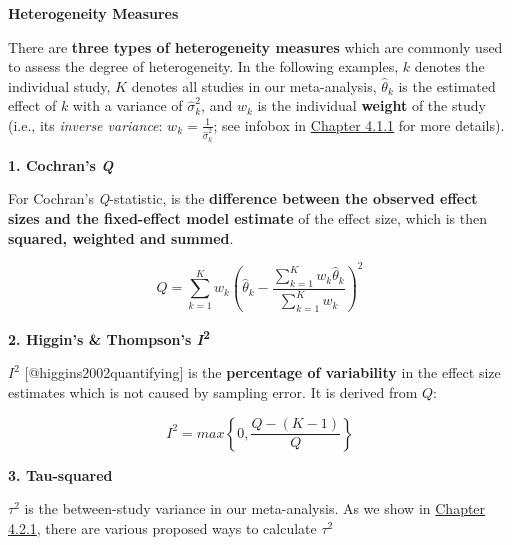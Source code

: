 \documentclass[]{book}
\theoremstyle{definition}
\theoremstyle{definition}
\theoremstyle{definition}
\theoremstyle{remark}
\begin{document}
\begin{rmdinfo}
\textbf{Heterogeneity Measures}

There are \textbf{three types of heterogeneity measures} which are
commonly used to assess the degree of heterogeneity. In the following
examples, \(k\) denotes the individual study, \(K\) denotes all studies
in our meta-analysis, \(\hat \theta_k\) is the estimated effect of \(k\)
with a variance of \(\hat \sigma^{2}_k\), and \(w_k\) is the individual
\textbf{weight} of the study (i.e., its \emph{inverse variance}:
\(w_k = \frac{1}{\hat \sigma^{2}_k}\); see infobox in
\protect\hyperlink{fixed}{Chapter 4.1.1} for more details).

\textbf{1. Cochran's \emph{Q} }

For Cochran's \emph{Q}-statistic, is the \textbf{difference between the
observed effect sizes and the fixed-effect model estimate} of the effect
size, which is then \textbf{squared, weighted and summed}.

\[ Q = \sum\limits_{k=1}^K w_k (\hat\theta_k  - \frac{\sum\limits_{k=1}^K w_k \hat\theta_k}{\sum\limits_{k=1}^K w_k})^{2}\]

\textbf{2. Higgin's \& Thompson's \emph{I}\textsuperscript{2} }

\(I^{2}\) {[}@higgins2002quantifying{]} is the \textbf{percentage of
variability} in the effect size estimates which is not caused by
sampling error. It is derived from \(Q\):

\[I^{2} = max \left\{0, \frac{Q-(K-1)}{Q}  \right\}\]

\textbf{3. Tau-squared}

\(\tau^{2}\) is the between-study variance in our meta-analysis. As we
show in \protect\hyperlink{tau2}{Chapter 4.2.1}, there are various
proposed ways to calculate \(\tau^{2}\)
\end{rmdinfo}
\end{document}
